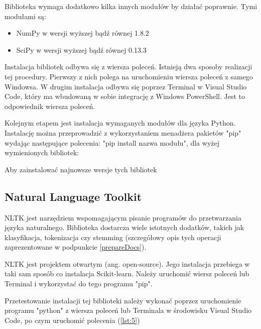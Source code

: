 Biblioteka wymaga dodatkowo kilka innych modułów by działać poprawnie. Tymi modułami są:
\begin{itemize}
    \item NumPy w wersji wyższej bądź równej 1.8.2
    \item SciPy w wersji wyższej bądź równej 0.13.3
\end{itemize}

Instalacja bibliotek odbywa się z wiersza poleceń. Istnieją dwa sposoby realizacji tej procedury. Pierwszy z nich polega na uruchomieniu wiersza poleceń z samego Windowsa. W drugim instalacja odbywa się poprzez Terminal w Visual Studio Code, który ma wbudowaną w sobie integrację z Windows PowerShell. Jest to odpowiednik wiersza poleceń.

Kolejnym etapem jest instalacja wymaganych modułów dla języka Python. Instalację można przeprowadzić z wykorzystaniem menadżera pakietów "pip" wydając następujące polecenia: "pip install {nazwa modułu}", dla wyżej wymienionych bibliotek:


Aby zainstalować najnowsze wersje tych bibliotek


\subsection{Natural Language Toolkit}
NLTK jest narzędziem wspomagającym pisanie programów do przetwarzania języka naturalnego. Biblioteka dostarcza wiele istotnych dodatków, takich jak klasyfikacja, tokenizacja czy stemming (szczegółowy opis tych operacji zaprezentowane w podpunkcie \ref{prepareDocs}).

NLTK jest projektem otwartym (ang. open-source). Jego instalacja przebiega w taki sam sposób co instalacja Scikit-learn. Należy uruchomić wiersz poleceń lub Terminal i wykorzystać do tego programu "pip".


Przetestowanie instalacji tej biblioteki należy wykonać poprzez uruchomienie programu "python" z wiersza poleceń lub Terminala w środowisku Visual Studio Code, po czym uruchomić polecenia (\ref{lst:5})


